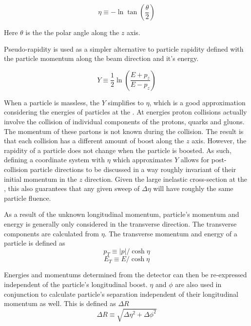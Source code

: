 \begin{equation}
    \eta \equiv - \ln{
    \tan \left(\frac{\theta}{2}\right) }
    \label{eq:pseudorapidity}
\end{equation}

Here \ensuremath{\theta} is the the polar angle along the \ensuremath{z} axis.

Pseudo-rapidity is used as a simpler alternative to particle rapidity defined with the particle momentum along the beam direction and it's energy.

\begin{equation}
    Y \equiv \frac{1}{2} \ln{\left( \frac{E+p_z}{E-p_z} \right)}
    \label{eq:rapidity}
\end{equation}

When a particle is massless, the \ensuremath{Y} simplifies to \ensuremath{\eta}, which is a good approximation considering the energies of particles at the \LHC.
At \LHC energies proton collisions actually involve the collision of individual components of the protons, quarks and gluons.  The momentum of these partons is not known during the collision.  The result is that each collision has a different amount of boost along the \ensuremath{z} axis.  
However, the rapidity of a particle does not change when the particle is boosted.  As such, defining a coordinate system with \ensuremath{\eta} which approximates \ensuremath{Y} allows for post-collision particle directions to be discussed in a way roughly invariant of their initial momentum in the \ensuremath{z} direction.  Given the large inelastic cross-section at the \LHC, this also guarantees that any given sweep of \ensuremath{\Delta \eta} will have roughly the same particle fluence.

As a result of the unknown longitudinal momentum, particle's momentum and energy is generally only considered in the transverse direction.  The transverse components are calculated from \ensuremath{\eta}.  The transverse momentum and energy of a particle is defined as
\begin{equation}
    p_T \equiv |p| / \cosh{\eta} 
    \label{eq:pT}
\end{equation}{}
\begin{equation}
    E_T \equiv E / \cosh{\eta} 
    \label{eq:Et}
\end{equation}{}

Energies and momentums determined from the detector can then be re-expressed independent of the particle's longitudinal boost.  \ensuremath{\eta} and \ensuremath{\phi} are also used in conjunction to calculate particle's separation independent of their longitudinal momentum as well.  This is defined as \ensuremath{\Delta R}
\begin{equation}
    \Delta R \equiv \sqrt{\Delta\eta^2 + \Delta\phi^2} 
    \label{eq:dR}
\end{equation}{}
